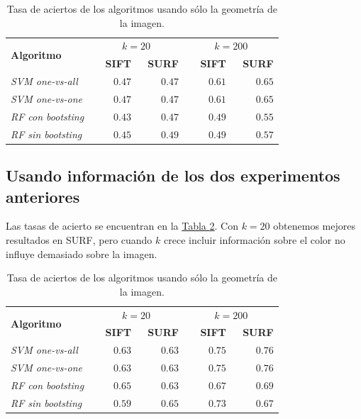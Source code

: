 \documentclass[paper=a4, fontsize=11pt]{article} %
\numberwithin{equation}{section} %
\numberwithin{figure}{section} %
\numberwithin{table}{section} %
\begin{document}
\begin{table}[H]
  \begin{tabular}{|l|r|r||r|r|}
  \hline
    \multirow{2}{*}{\textbf{Algoritmo}} & \multicolumn{2}{c||}{$k=20$} & \multicolumn{2}{c|}{$k=200$} \\
    \cline{2-5}
    & \textbf{SIFT} & \textbf{SURF} & \textbf{SIFT} & \textbf{SURF} \\
    \hline
    \textit{SVM one-vs-all} & $\qquad 0.47$ & $\qquad 0.47$ & $\qquad 0.61$ & $\qquad 0.65$ \\ 
    \textit{SVM one-vs-one} & $\qquad 0.47$ & $\qquad 0.47$ & $\qquad 0.61$ & $\qquad 0.65$ \\
    \textit{RF con bootsting} & $\qquad 0.43$ & $\qquad 0.47$ & $\qquad 0.49$ & $\qquad 0.55$ \\
    \textit{RF sin bootsting} & $\qquad 0.45$ & $\qquad 0.49$ & $\qquad 0.49$ & $\qquad 0.57$ \\
    \hline
  \end{tabular}
  \label{resColor}
  \caption{Tasa de aciertos de los algoritmos usando sólo la geometría de la imagen.}
\end{table}

\subsection{Usando información de los dos experimentos anteriores}

Las tasas de acierto se encuentran en la \hyperref[resAmbos]{Tabla \ref*{resAmbos}}. Con $k=20$ obtenemos mejores resultados en SURF, pero cuando $k$ crece incluir información sobre el color no influye demasiado sobre la imagen.

\begin{table}[H]
  \begin{tabular}{|l|r|r||r|r|}
  \hline
    \multirow{2}{*}{\textbf{Algoritmo}} & \multicolumn{2}{c||}{$k=20$} & \multicolumn{2}{c|}{$k=200$} \\
    \cline{2-5}
    & \textbf{SIFT} & \textbf{SURF} & \textbf{SIFT} & \textbf{SURF} \\
    \hline
    \textit{SVM one-vs-all} & $\qquad 0.63$ & $\qquad 0.63$ & $\qquad 0.75$ & $\qquad 0.76$ \\ 
    \textit{SVM one-vs-one} & $\qquad 0.63$ & $\qquad 0.63$ & $\qquad 0.75$ & $\qquad 0.76$ \\
    \textit{RF con bootsting} & $\qquad 0.65$ & $\qquad 0.63$ & $\qquad 0.67$ & $\qquad 0.69$ \\
    \textit{RF sin bootsting} & $\qquad 0.59$ & $\qquad 0.65$ & $\qquad 0.73$ & $\qquad 0.67$ \\
    \hline
  \end{tabular}
  \label{resAmbos}
  \caption{Tasa de aciertos de los algoritmos usando sólo la geometría de la imagen.}
\end{table}
\end{document}
